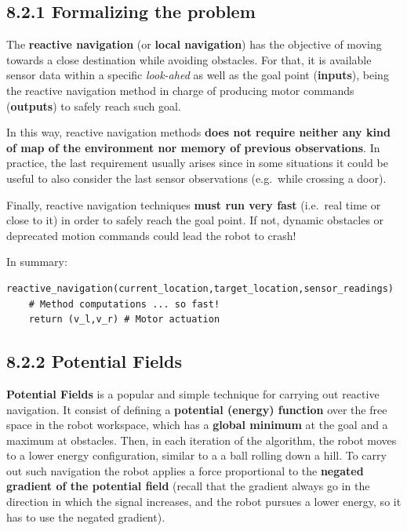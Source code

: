 \documentclass[11pt]{article}
\begin{document}
    \hypertarget{formalizing-the-problem}{%
\subsection{8.2.1 Formalizing the
problem}\label{formalizing-the-problem}}

The \textbf{reactive navigation} (or \textbf{local navigation}) has the
objective of moving towards a close destination while avoiding
obstacles. For that, it is available sensor data within a specific
\emph{look-ahed} as well as the goal point (\textbf{inputs}), being the
reactive navigation method in charge of producing motor commands
(\textbf{outputs}) to safely reach such goal.

In this way, reactive navigation methods \textbf{does not require
neither any kind of map of the environment nor memory of previous
observations}. In practice, the last requirement usually arises since in
some situations it could be useful to also consider the last sensor
observations (e.g.~while crossing a door).

Finally, reactive navigation techniques \textbf{must run very fast}
(i.e.~real time or close to it) in order to safely reach the goal point.
If not, dynamic obstacles or deprecated motion commands could lead the
robot to crash!

In summary:

\begin{verbatim}
reactive_navigation(current_location,target_location,sensor_readings)
    # Method computations ... so fast!
    return (v_l,v_r) # Motor actuation
\end{verbatim}

    \hypertarget{potential-fields}{%
\subsection{8.2.2 Potential Fields}\label{potential-fields}}

\textbf{Potential Fields} is a popular and simple technique for carrying
out reactive navigation. It consist of defining a \textbf{potential
(energy) function} over the free space in the robot workspace, which has
a \textbf{global minimum} at the goal and a maximum at obstacles. Then,
in each iteration of the algorithm, the robot moves to a lower energy
configuration, similar to a a ball rolling down a hill. To carry out
such navigation the robot applies a force proportional to the
\textbf{negated gradient of the potential field} (recall that the
gradient always go in the direction in which the signal increases, and
the robot pursues a lower energy, so it has to use the negated
gradient).
\end{document}

